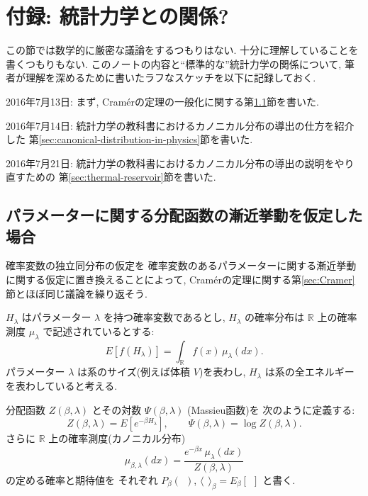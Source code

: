 \documentclass[12pt,twoside]{jarticle}
\newcommand\R{{\mathbb R}} %
\newcommand\bra{\langle}
\newcommand\ket{\rangle}
\theoremstyle{jplain}
\theoremstyle{jplain}
\theoremstyle{jplain}
\numberwithin{theorem}{section}
\numberwithin{equation}{section}
\numberwithin{figure}{section}
\numberwithin{table}{section}
\newcommand\secref[1]{第\ref{#1}節}
\begin{document}

\section{付録: 統計力学との関係?}
\label{sec:statistical-mechanics}

この節では数学的に厳密な議論をするつもりはない.
十分に理解していることを書くつもりもない.
このノートの内容と``標準的な''統計力学の関係について,
筆者が理解を深めるために書いたラフなスケッチを以下に記録しておく.

2016年7月13日:
まず, Cram\'erの定理の一般化に関する\secref{sec:generalized-Cramer}を書いた.

2016年7月14日:
統計力学の教科書におけるカノニカル分布の導出の仕方を紹介した
\secref{sec:canonical-distribution-in-physics}を書いた.

2016年7月21日:
統計力学の教科書におけるカノニカル分布の導出の説明をやり直すための
\secref{sec:thermal-reservoir}を書いた.


\subsection{パラメーターに関する分配函数の漸近挙動を仮定した場合}
\label{sec:generalized-Cramer}

確率変数の独立同分布の仮定を
確率変数のあるパラメーターに関する漸近挙動に関する仮定に置き換えることによって,
Cram\'erの定理に関する\secref{sec:Cramer}とほぼ同じ議論を繰り返そう.

$H_\lambda$ はパラメーター $\lambda$ を持つ確率変数であるとし,
$H_\lambda$ の確率分布は $\R$ 上の確率測度 $\mu_\lambda$ で記述されているとする:
\[
E[f(H_\lambda)] = \int_\R f(x)\,\mu_\lambda(dx).
\]
パラメーター $\lambda$ は系のサイズ(例えば体積 $V$)を表わし,
$H_\lambda$ は系の全エネルギーを表わしていると考える.

分配函数 $Z(\beta,\lambda)$ とその対数 $\Psi(\beta,\lambda)$ (Massieu函数)を
次のように定義する:
\[
Z(\beta,\lambda)=E[e^{-\beta H_\lambda}], \qquad
\Psi(\beta,\lambda)=\log Z(\beta,\lambda).
\]
さらに $\R$ 上の確率測度(カノニカル分布)
\[
\mu_{\beta,\lambda}(dx)=\frac{e^{-\beta x}\,\mu_\lambda(dx)}{Z(\beta,\lambda)}
\]
の定める確率と期待値を
それぞれ $P_\beta(\ \ )$, $\bra\ \ \ket_\beta=E_\beta[\ \ ]$ と書く.
\end{document}
